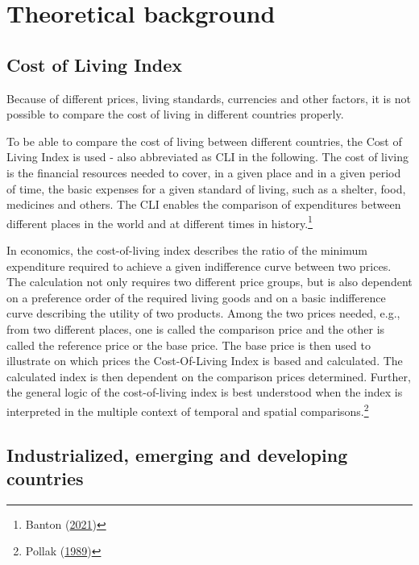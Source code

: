 \documentclass[
  11pt,
  a4paper,
  twoside]{scrbook}
\begin{document}
\linespread{1}

\hypertarget{theoretical-background}{%
\chapter{Theoretical background}\label{theoretical-background}}

\hypertarget{cost-of-living-index}{%
\section{Cost of Living Index}\label{cost-of-living-index}}

Because of different prices, living standards, currencies and other factors, it is not possible to compare the cost of living in different countries properly.

To be able to compare the cost of living between different countries, the Cost of Living Index is used - also abbreviated as CLI in the following. The cost of living is the financial resources needed to cover, in a given place and in a given period of time, the basic expenses for a given standard of living, such as a shelter, food, medicines and others. The CLI enables the comparison of expenditures between different places in the world and at different times in history.\footnote{Banton (\protect\hyperlink{ref-caroline}{2021})}

In economics, the cost-of-living index describes the ratio of the minimum expenditure required to achieve a given indifference curve between two prices. The calculation not only requires two different price groups, but is also dependent on a preference order of the required living goods and on a basic indifference curve describing the utility of two products.
Among the two prices needed, e.g., from two different places, one is called the comparison price and the other is called the reference price or the base price. The base price is then used to illustrate on which prices the Cost-Of-Living Index is based and calculated. The calculated index is then dependent on the comparison prices determined. Further, the general logic of the cost-of-living index is best understood when the index is interpreted in the multiple context of temporal and spatial comparisons.\footnote{Pollak (\protect\hyperlink{ref-Pollak1989}{1989})}

\hypertarget{industrialized-emerging-and-developing-countries}{%
\section{Industrialized, emerging and developing countries}\label{industrialized-emerging-and-developing-countries}}
\end{document}
